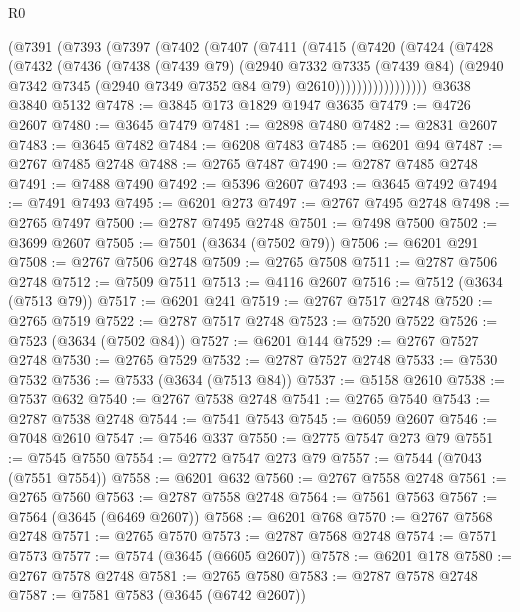\begin{lexlean}{R0}
\begin{coremodule}
        (@7391
          (@7393
            (@7397
              (@7402
                (@7407
                  (@7411
                    (@7415
                      (@7420
                        (@7424
                          (@7428
                            (@7432
                              (@7436
                                (@7438
                                  (@7439 @79)
                                  (@2940
                                    @7332
                                    @7335
                                    (@7439 @84)
                                    (@2940
                                      @7342
                                      @7345
                                      (@2940 @7349 @7352 @84 @79)
                                      @2610)))))))))))))))))
    @3638
    @3840
    @5132
@7478 := @3845 @173 @1829 @1947 @3635
@7479 := @4726 @2607
@7480 := @3645 @7479
@7481 := @2898 @7480
@7482 := @2831 @2607
@7483 := @3645 @7482
@7484 := @6208 @7483
@7485 := @6201 @94
@7487 := @2767 @7485 @2748
@7488 := @2765 @7487
@7490 := @2787 @7485 @2748
@7491 := @7488 @7490
@7492 := @5396 @2607
@7493 := @3645 @7492
@7494 := @7491 @7493
@7495 := @6201 @273
@7497 := @2767 @7495 @2748
@7498 := @2765 @7497
@7500 := @2787 @7495 @2748
@7501 := @7498 @7500
@7502 := @3699 @2607
@7505 := @7501 (@3634 (@7502 @79))
@7506 := @6201 @291
@7508 := @2767 @7506 @2748
@7509 := @2765 @7508
@7511 := @2787 @7506 @2748
@7512 := @7509 @7511
@7513 := @4116 @2607
@7516 := @7512 (@3634 (@7513 @79))
@7517 := @6201 @241
@7519 := @2767 @7517 @2748
@7520 := @2765 @7519
@7522 := @2787 @7517 @2748
@7523 := @7520 @7522
@7526 := @7523 (@3634 (@7502 @84))
@7527 := @6201 @144
@7529 := @2767 @7527 @2748
@7530 := @2765 @7529
@7532 := @2787 @7527 @2748
@7533 := @7530 @7532
@7536 := @7533 (@3634 (@7513 @84))
@7537 := @5158 @2610
@7538 := @7537 @632
@7540 := @2767 @7538 @2748
@7541 := @2765 @7540
@7543 := @2787 @7538 @2748
@7544 := @7541 @7543
@7545 := @6059 @2607
@7546 := @7048 @2610
@7547 := @7546 @337
@7550 := @2775 @7547 @273 @79
@7551 := @7545 @7550
@7554 := @2772 @7547 @273 @79
@7557 := @7544 (@7043 (@7551 @7554))
@7558 := @6201 @632
@7560 := @2767 @7558 @2748
@7561 := @2765 @7560
@7563 := @2787 @7558 @2748
@7564 := @7561 @7563
@7567 := @7564 (@3645 (@6469 @2607))
@7568 := @6201 @768
@7570 := @2767 @7568 @2748
@7571 := @2765 @7570
@7573 := @2787 @7568 @2748
@7574 := @7571 @7573
@7577 := @7574 (@3645 (@6605 @2607))
@7578 := @6201 @178
@7580 := @2767 @7578 @2748
@7581 := @2765 @7580
@7583 := @2787 @7578 @2748
@7587 := @7581 @7583 (@3645 (@6742 @2607))

\end{coremodule}
\end{lexlean}
